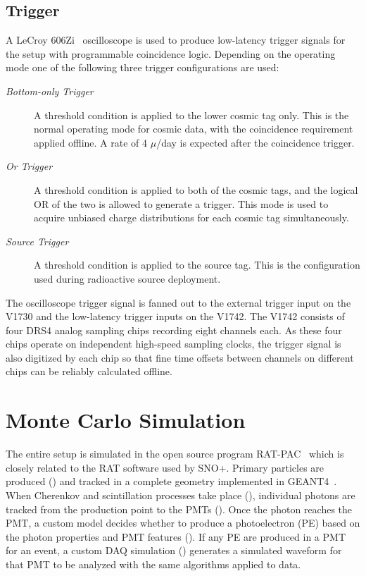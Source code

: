 \subsection{Trigger}
\label{sec:triggering}

A LeCroy 606Zi~\cite{lecroy606zi} oscilloscope is used to produce low-latency trigger signals for the setup with programmable coincidence logic. 
Depending on the operating mode one of the following three trigger configurations are used:
\begin{description}
\item [\rm\it Bottom-only Trigger] A threshold condition is applied to the lower cosmic tag only. 
This is the normal operating mode for cosmic data, with the coincidence requirement applied offline.  
A rate of 4 $\mu$/day is expected after the coincidence trigger.
\item [\rm\it Or Trigger] A threshold condition is applied to both of the cosmic tags, and the logical OR of the two is allowed to generate a trigger. 
This mode is used to acquire unbiased charge distributions for each cosmic tag simultaneously.
\item [\rm\it Source Trigger] A threshold condition is applied to the source tag. 
This is the configuration used during radioactive source deployment.
\end{description}
The oscilloscope trigger signal is fanned out to the external trigger input on the V1730 and the low-latency trigger inputs on the V1742.
The V1742 consists of four DRS4 analog sampling chips recording eight channels each.
As these four chips operate on independent high-speed sampling clocks, the trigger signal is also digitized by each chip so that fine time offsets between channels on different chips can be reliably calculated offline.  



\section{Monte Carlo Simulation}
\label{sec:simulation}

The entire setup is simulated in the open source program RAT-PAC~\cite{ratpac} which is closely related to the RAT software used by SNO+. 
Primary particles are produced () and tracked in a complete geometry implemented in GEANT4~\cite{geant4}. 
When Cherenkov and scintillation processes take place (), individual photons are tracked from the production point to the PMTs (). 
Once the photon reaches the PMT, a custom model decides whether to produce a photoelectron (PE) based on the photon properties and PMT features (). 
If any PE are produced in a PMT for an event, a custom DAQ simulation () generates a simulated waveform for that PMT to be analyzed with the same algorithms applied to data.

